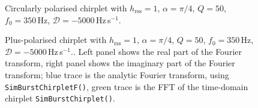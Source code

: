 \documentclass[11pt]{ligovirgodcc}
\begin{document}
\begin{figure}
\centering
{}
\caption{Circularly polarised chirplet with $h_{\mathrm{rss}}=1$, $\alpha=\pi/4$,
$Q=50$, $f_0=350$\,Hz, $\mathcal{D}=-5000$\,Hz\,s$^{-1}$.\label{fig:circpol}}
\end{figure}

\begin{figure}
\centering
{}
\caption{Plus-polarised chirplet with $h_{\mathrm{rss}}=1$, $\alpha=\pi/4$,
$Q=50$, $f_0=350$\,Hz, $\mathcal{D}=-5000$\,Hz\,s$^{-1}$.\label{fig:fdomlinpol}.
 Left panel shows the real part of the Fourier transform, right panel shows the
 imaginary part of the Fourier transform; blue trace is the analytic Fourier
 transform, using {\tt SimBurstChirpletF()}, green trace is the FFT of the
 time-domain chirplet {\tt SimBurstChirplet()}.}
\end{figure}

%



\end{document}
